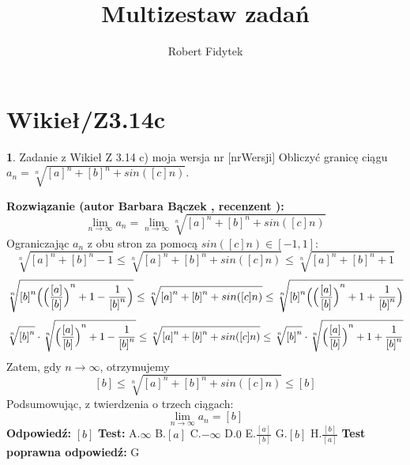 \documentclass[12pt, a4paper]{article}
\title{Multizestaw zadań}
\author{Robert Fidytek}
\date{}
\theoremstyle{definition} %
\newtheorem{zad}{}
\newcommand{\kategoria}[1]{\section{#1}} %
\newcommand{\zadStart}[1]{\begin{zad}#1\newline} %
\newcommand{\zadStop}{\end{zad}}   %
\newcommand{\rozwStart}[2]{\noindent \textbf{Rozwiązanie (autor #1 , recenzent #2): }\newline} %
\newcommand{\rozwStop}{\newline}                                            %
\newcommand{\odpStart}{\noindent \textbf{Odpowiedź:}\newline}    %
\newcommand{\odpStop}{\newline}                                             %
\newcommand{\testStart}{\noindent \textbf{Test:}\newline} %
\newcommand{\testStop}{\newline} %
\newcommand{\kluczStart}{\noindent \textbf{Test poprawna odpowiedź:}\newline} %
\newcommand{\kluczStop}{\newline} %
\begin{document}
\maketitle


\kategoria{Wikieł/Z3.14c}
\zadStart{Zadanie z Wikieł Z 3.14 c) moja wersja nr [nrWersji]}
Obliczyć granicę ciągu $a_n= \sqrt[n]{[a]^n + [b]^n +sin([c]n)}$.
\zadStop
\rozwStart{Barbara Bączek}{}
$$\lim_{n \rightarrow \infty} a_n= \lim_{n \rightarrow \infty} \sqrt[n]{{[a]}^n + {[b]}^n +sin([c]n)}$$
Ograniczając $a_n$ z obu stron za pomocą $sin([c]n) \in [-1,1]$:
$$\sqrt[n]{{[a]}^n + {[b]}^n -1} \leq  \sqrt[n]{{[a]}^n + {[b]}^n +sin([c]n)} \leq  \sqrt[n]{{[a]}^n + {[b]}^n + 1}$$
$$\sqrt[n]{{[b]}^n\Big{(}{\Big{(}\frac{[a]}{[b]}\Big{)}}^n + 1 -\frac{1}{{[b]}^n}\Big{)}} \leq  \sqrt[n]{{[a]}^n + {[b]}^n +sin([c]n)} \leq \sqrt[n]{{[b]}^n\Big{(}{\Big{(}\frac{[a]}{[b]}\Big{)}}^n + 1 +\frac{1}{{[b]}^n}\Big{)}}$$
$$\sqrt[n]{{[b]}^n} \cdot \sqrt[n]{{\Big{(}\frac{[a]}{[b]}\Big{)}}^n + 1 -\frac{1}{{[b]}^n}} \leq  \sqrt[n]{{[a]}^n + {[b]}^n +sin([c]n)} \leq \sqrt[n]{{[b]}^n}\cdot \sqrt[n]{{\Big{(}\frac{[a]}{[b]}\Big{)}}^n + 1 +\frac{1}{{[b]}^n}}$$
Zatem, gdy $n \rightarrow \infty$, otrzymujemy
$$ [b] \leq \sqrt[n]{{[a]}^n + {[b]}^n +sin([c]n)} \leq [b] $$
Podsumowując, z twierdzenia o trzech ciągach:  $$\lim_{n \rightarrow \infty} a_n= [b]$$
\rozwStop
\odpStart
$[b]$
\odpStop
\testStart
A.$\infty$
B.$[a]$
C.$-\infty$
D.$0$
E.$\frac{[a]}{[b]}$
G.$[b]$
H.$\frac{[b]}{[a]}$
\testStop
\kluczStart
G
\kluczStop
\end{document}
